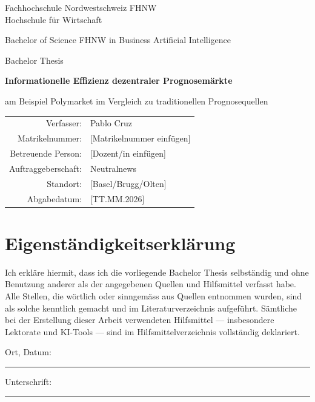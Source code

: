 \documentclass[11pt,a4paper]{report}
\begin{document}
\begin{titlepage}
\centering
{\large Fachhochschule Nordwestschweiz FHNW\\
Hochschule für Wirtschaft\par}
\vspace{0.3cm}
{\large Bachelor of Science FHNW in Business Artificial Intelligence\par}%
\vspace{2.2cm}
{\large Bachelor Thesis\par}
\vspace{1.2cm}
{\huge\bfseries Informationelle Effizienz dezentraler Prognosemärkte\par}
\vspace{0.5cm}
{\Large am Beispiel Polymarket im Vergleich zu traditionellen Prognosequellen\par}
\vspace{2.5cm}
\begin{tabular}{rl}
Verfasser: & Pablo Cruz\\[2pt]
Matrikelnummer: & [Matrikelnummer einfügen]\\[2pt]
Betreuende Person: & [Dozent/in einfügen]\\[2pt]
Auftraggeberschaft: & Neutralnews\\[2pt]
Standort: & [Basel/Brugg/Olten]\\[2pt]
Abgabedatum: & [TT.MM.2026]\\
\end{tabular}
\vfill
\end{titlepage}

\setcounter{page}{2}

\chapter*{Eigenständigkeitserklärung}
Ich erkläre hiermit, dass ich die vorliegende Bachelor Thesis selbständig und
ohne Benutzung anderer als der angegebenen Quellen und Hilfsmittel verfasst habe.
Alle Stellen, die wörtlich oder sinngemäss aus Quellen entnommen wurden, sind als
solche kenntlich gemacht und im Literaturverzeichnis aufgeführt. Sämtliche bei der
Erstellung dieser Arbeit verwendeten Hilfsmittel --- insbesondere Lektorate und
KI-Tools --- sind im Hilfsmittelverzeichnis vollständig deklariert.

\vspace{1.5cm}
\noindent Ort, Datum: \rule{5cm}{0.4pt} \hfill Unterschrift: \rule{5cm}{0.4pt}
\end{document}
